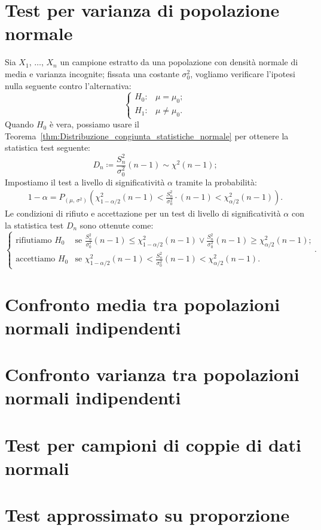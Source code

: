     \section{Test per varianza di popolazione normale}
    \begin{defn}
        Sia $X_1,\, \ldots,\, X_{n}$ un campione estratto da una popolazione con densità normale di media e 
        varianza incognite; fissata una costante $\sigma^2_0$, vogliamo verificare l'ipotesi nulla seguente 
        contro l'alternativa: \[
            \begin{cases}
                H_0 : & \mu = \mu_0; \\
                H_1 : & \mu \neq \mu_0.
            \end{cases}
        \] Quando $H_0$ è vera, possiamo usare il Teorema~\ref{thm:Distribuzione_congiunta_statistiche_normale} 
        per ottenere la statistica test seguente: \[
            D_n \coloneqq \frac{S_n^2}{\sigma_0^2}(n-1) \sim  \chi^2(n-1)
        ;\] Impostiamo il test a livello di significatività $\alpha$ tramite la probabilità:
        \begin{align*}
            1-\alpha = P_{(\mu,\,\sigma^2)}\left(\chi^2_{1-\alpha /2}(n-1) < \frac{S_n^2}{\sigma_0^2}\cdot(n-1) 
            < \chi^2_{\alpha /2}(n-1)\right)
        .\end{align*}
        Le condizioni di rifiuto e accettazione per un test di livello di significatività $\alpha$ con la 
        statistica test $D_n$ sono ottenute come: \[
            \begin{cases}
                \text{rifiutiamo } H_0 & 
                \text{se $\frac{S_n^2}{\sigma_0^2}(n-1) \leq \chi^2_{1-\alpha /2}(n-1) \lor 
                \frac{S_n^2}{\sigma_0^2}(n-1) \geq \chi^2_{\alpha /2}(n-1)$;} \\
                \text{accettiamo } H_0 & 
                \text{se $\chi^2_{1-\alpha /2}(n-1) < \frac{S_n^2}{\sigma_0^2}(n-1) < \chi^2_{\alpha /2}(n-1)$.}
            \end{cases}
        .\] 
    \end{defn}
    \section{Confronto media tra popolazioni normali indipendenti}
        \begin{defn}[$\mu_1=\mu_2=\,?,\, \sigma^2_1=\sigma^2_{1,\,0},\, \sigma^2_2=\sigma^2_{2,\,0}$]
            
        \end{defn}
    \section{Confronto varianza tra popolazioni normali indipendenti}
    \section{Test per campioni di coppie di dati normali}
    \section{Test approssimato su proporzione}
